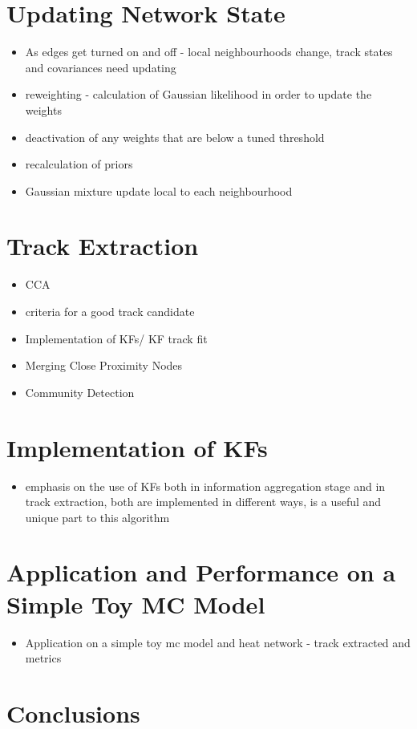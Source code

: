 \section{Updating Network State}
\begin{itemize}
    \item As edges get turned on and off - local neighbourhoods change, track states and covariances need updating
    \item reweighting - calculation of Gaussian likelihood in order to update the weights
    \item deactivation of any weights that are below a tuned threshold
    \item recalculation of priors
    \item Gaussian mixture update local to each neighbourhood
\end{itemize}



\section{Track Extraction}
\begin{itemize}
    \item CCA
    \item criteria for a good track candidate
    \item Implementation of KFs/ KF track fit
    \item Merging Close Proximity Nodes
    \item Community Detection
\end{itemize}



\section{Implementation of KFs}
\begin{itemize}
\item emphasis on the use of KFs both in information aggregation stage and in track extraction, both are implemented in different ways, is a useful and unique part to this algorithm
\end{itemize}



\section{Application and Performance on a Simple Toy MC Model}
\begin{itemize}
\item Application on a simple toy mc model and heat network - track extracted and metrics
\end{itemize}



\section{Conclusions}
